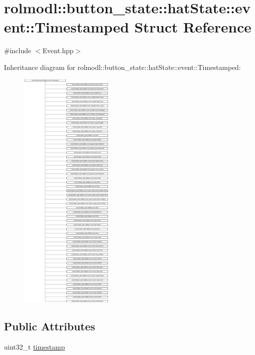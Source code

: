 \hypertarget{structrolmodl_1_1button__state_1_1hat_state_1_1event_1_1_timestamped}{}\section{rolmodl\+::button\+\_\+state\+::hat\+State\+::event\+::Timestamped Struct Reference}
\label{structrolmodl_1_1button__state_1_1hat_state_1_1event_1_1_timestamped}


{\ttfamily \#include $<$Event.\+hpp$>$}

Inheritance diagram for rolmodl\+::button\+\_\+state\+::hat\+State\+::event\+::Timestamped\+:\begin{figure}[H]
\begin{center}
\leavevmode
\includegraphics[height=12.000000cm]{structrolmodl_1_1button__state_1_1hat_state_1_1event_1_1_timestamped}
\end{center}
\end{figure}
\subsection*{Public Attributes}
\begin{DoxyCompactItemize}
\item 
uint32\+\_\+t \mbox{\hyperlink{structrolmodl_1_1button__state_1_1hat_state_1_1event_1_1_timestamped_a907b4efff3dbc08e4c64511f03f39071}{timestamp}}
\end{DoxyCompactItemize}


